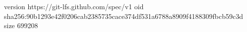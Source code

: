 version https://git-lfs.github.com/spec/v1
oid sha256:90b1293e42f0206cab2385735cace374df531a6788a8909f4188309fbcb59c3d
size 699208
